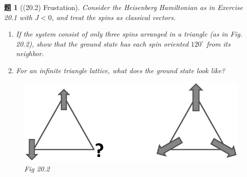 \documentclass[UTF8,10pt,a4paper]{article}
\theoremstyle{Problem}
\newtheorem{prob}{题}
\theoremstyle{Solution}
\begin{document}
\begin{prob}[(20.2) Frustation]
    Consider the Heisenberg Hamiltonian as in Exercise 20.1 with $J<0$, and treat the spins as classical vectors.
    \begin{enumerate}
        \item[(a)] If the system consist of only three spins arranged in a triangle (as in Fig. 20.2), show that the ground state has each spin oriented $120^{\circ}$ from its neighbor.
        \item[(b)] For an infinite triangle lattice, what does the ground state look like?
    \end{enumerate}
    \begin{figure}[h]
        \centering
        \includegraphics[width=.5\textwidth]{5.png}
        \caption{Fig 20.2}
    \end{figure}
\end{prob}
\end{document}
